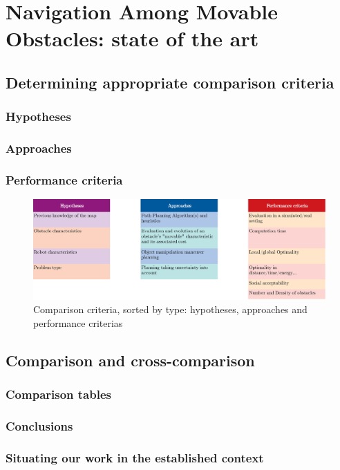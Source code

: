 
\chapter{Navigation Among Movable Obstacles: state of the art} %

\label{Chapter2} %

\section{Determining appropriate comparison criteria}

\subsection{Hypotheses}

\subsection{Approaches}

\subsection{Performance criteria}

\begin{figure}[H]
\centering
\includegraphics[width=13cm]{Comparison_Table/comparison_criteria}
\decoRule
\caption[Comparison criteria listing]{Comparison criteria, sorted by type: hypotheses, approaches and performance criterias}
\label{fig:comparison_criteria}
\end{figure}

\section{Comparison and cross-comparison}

\subsection{Comparison tables}

\subsection{Conclusions}

\subsection{Situating our work in the established context}
